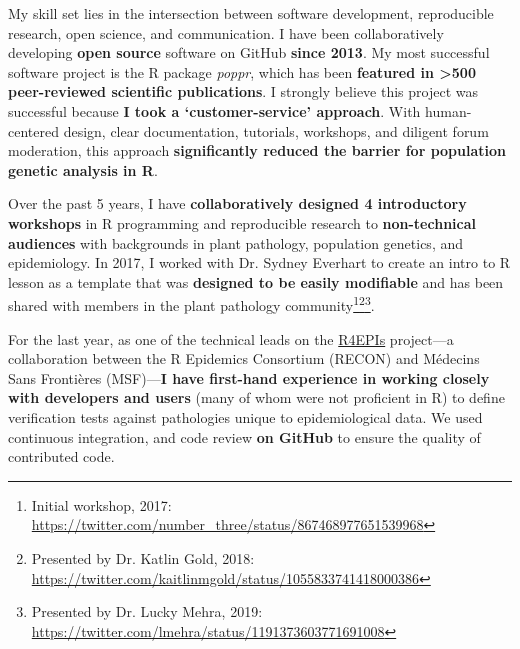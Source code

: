 \vspace{1ex}






My skill set lies in the intersection between software development,
reproducible research, open science, and communication.  I have been
collaboratively developing \textbf{open source} software on GitHub
\textbf{since 2013}. My most successful software project is the R package
\textit{poppr}, which has been \textbf{featured in \textgreater500
peer-reviewed scientific publications}. I strongly believe this project was
successful because \textbf{I took a `customer-service' approach}.  With
human-centered design, clear documentation, tutorials, workshops, and diligent
forum moderation, this approach \textbf{significantly reduced the barrier for
population genetic analysis in R}.

Over the past 5 years, I have \textbf{collaboratively designed 4 introductory
workshops} in R programming and reproducible research to \textbf{non-technical
audiences} with backgrounds in plant pathology, population genetics, and
epidemiology. In 2017, I worked with Dr. Sydney Everhart to create an
intro to R lesson as a template that was \textbf{designed to be easily
modifiable} and has been shared with members in the plant pathology
community\footnote{Initial workshop, 2017:
\url{https://twitter.com/number_three/status/867468977651539968}}\footnote{Presented
by Dr. Katlin Gold, 2018:
\url{https://twitter.com/kaitlinmgold/status/1055833741418000386}}\footnote{Presented
by Dr. Lucky Mehra, 2019:
\url{https://twitter.com/lmehra/status/1191373603771691008}}.

\vspace{1ex}

For the last year, as one of the technical leads on the
\href{https://r4epis.netlify.com}{R4EPIs} project---a collaboration between the
R Epidemics Consortium (RECON) and M\'{e}decins Sans Fronti\`{e}res (MSF)---\textbf{I
have first-hand experience in working closely with developers and users} (many
of whom were not proficient in R) to define verification tests against
pathologies unique to epidemiological data. We used 
continuous integration, and code review \textbf{on GitHub} to ensure the quality of
contributed code.



